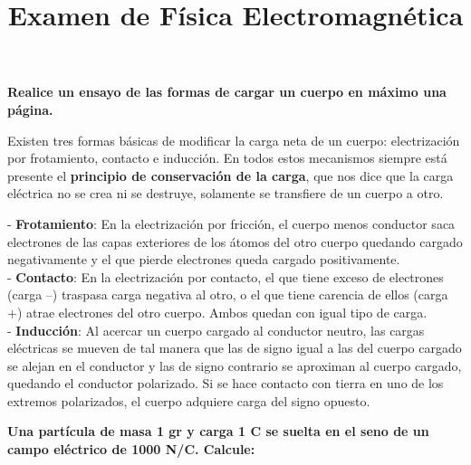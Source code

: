 \documentclass[12pt, answers]{exam}
\begin{document}
\title{Examen de Física Electromagnética}
\author{}
\date{}
\maketitle

\begin{questions}

	\question \large\textbf{Realice un ensayo de las formas de cargar un cuerpo en máximo una página.}

	Existen tres formas básicas de modificar la carga neta de un cuerpo: electrización por frotamiento, contacto e inducción. En todos estos mecanismos siempre está presente el \textbf{principio de conservación de la carga}, que nos dice que la carga eléctrica no se crea ni se destruye, solamente se transfiere de un cuerpo a otro.

	- \textbf{Frotamiento}: En la electrización por fricción, el cuerpo menos conductor saca electrones de las capas exteriores de los átomos del otro cuerpo quedando cargado negativamente y el que pierde electrones queda cargado positivamente.\\
	- \textbf{Contacto}: En la electrización por contacto, el que tiene exceso de electrones (carga –) traspasa carga negativa al otro, o el que tiene carencia de ellos (carga +) atrae electrones del otro cuerpo. Ambos quedan con igual tipo de carga.\\
	- \textbf{Inducción}: Al acercar un cuerpo cargado al conductor neutro, las cargas eléctricas se mueven de tal manera que las de signo igual a las del cuerpo cargado se alejan en el conductor y las de signo contrario se aproximan al cuerpo cargado, quedando el conductor polarizado. Si se hace contacto con tierra en uno de los extremos polarizados, el cuerpo adquiere carga del signo opuesto.


	\question \large\textbf {Una partícula de masa 1 gr y carga 1 C se suelta en el seno de un campo eléctrico de 1000 N/C. Calcule:}
\end{questions}
\end{document}
